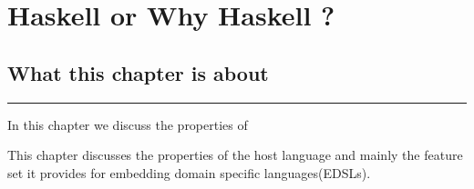 \documentclass[thesis-solanki.tex]{subfiles}
\begin{document}
\chapter{Haskell or Why Haskell ?}\label{chap:hwh}


\section{What this chapter is about}

\noindent\rule{\textwidth}{0.5pt}


In this chapter we discuss the properties of 

This chapter discusses the properties of the host language  and mainly the feature set it
provides for embedding domain specific languages(EDSLs).
\end{document}
